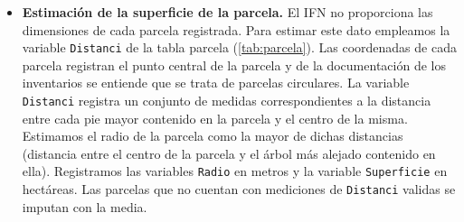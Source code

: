 \begin{itemize}
\medskip

\item \textbf{Estimación de la superficie de la parcela.} El IFN no proporciona las dimensiones de cada parcela registrada. Para estimar este dato empleamos la variable \texttt{Distanci} de la tabla parcela (\ref{tab:parcela}). Las coordenadas de cada parcela registran el punto central de la parcela y de la documentación de los inventarios se entiende que se trata de parcelas circulares. La variable \texttt{Distanci} registra un conjunto de medidas correspondientes a la distancia entre cada pie mayor contenido en la parcela y el centro de la misma. Estimamos el radio de la parcela como la mayor de dichas distancias (distancia entre el centro de la parcela y el árbol más alejado contenido en ella). Registramos las variables \texttt{Radio} en metros y la variable \texttt{Superficie} en hectáreas. Las parcelas que no cuentan con mediciones de \texttt{Distanci} validas se imputan con la media. 
 
\end{itemize}
